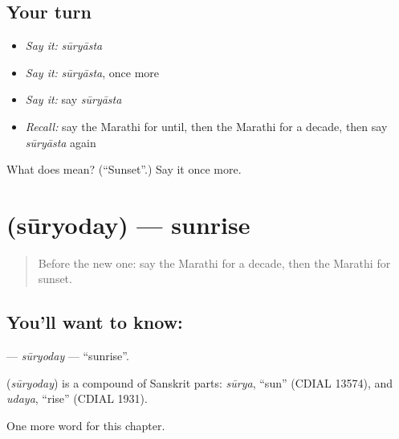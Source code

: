 \subsection*{Your turn}
\begin{itemize}
\raggedright
  \item \emph{Say it:} \emph{sūryāsta}
  \item \emph{Say it:} \emph{sūryāsta}, once more
  \item \emph{Say it:} say \emph{sūryāsta}
  \item \emph{Recall:} say the Marathi for until, then the Marathi for a decade, then say \emph{sūryāsta} again
\end{itemize}

\begin{tcolorbox}[breakable,colback=teal!4,colframe=teal!35!black,title={Before you move on}]
What does  mean? (\textquotedblleft{}Sunset\textquotedblright{}.) Say it once more.
\end{tcolorbox}
\section[\texorpdfstring{\mr{सूर्योदय} (sūryoday)}{सूर्योदय (sūryoday)}]{ (sūryoday) — sunrise}

\label{lesson:MR-C201-suryoday}



\begin{quote}
Before the new one: say the Marathi for a decade, then the Marathi for sunset.
\end{quote}

\subsection*{You'll want to know: }
\textbf{} — \emph{sūryoday} — \textquotedblleft{}sunrise\textquotedblright{}.

\begin{cousinweb}
\textbf{} (\emph{sūryoday}) is a compound of Sanskrit parts: \emph{sūrya}, \textquotedblleft{}sun\textquotedblright{} (CDIAL 13574), and \emph{udaya}, \textquotedblleft{}rise\textquotedblright{} (CDIAL 1931).
\end{cousinweb}

\begin{grammarlens}[title={What you've built}]
One more word for this chapter.
\end{grammarlens}


